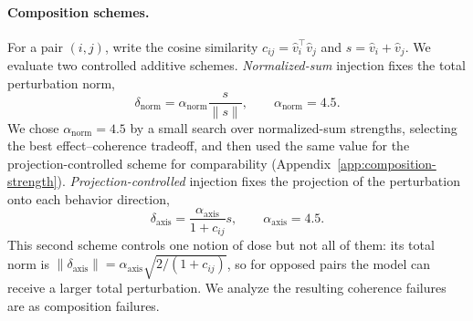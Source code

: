 \documentclass{article}
\begin{document}
\paragraph{Composition schemes.}
For a pair $(i,j)$, write the cosine similarity $c_{ij}=\hat v_i^\top \hat v_j$ and $s=\hat v_i+\hat v_j$. We evaluate two
controlled additive schemes. \emph{Normalized-sum} injection fixes the total perturbation norm,
\begin{equation}
  \delta_{\mathrm{norm}} = \alpha_{\mathrm{norm}}\frac{s}{\lVert s\rVert},
  \qquad \alpha_{\mathrm{norm}}=4.5.
  \label{eq:normsum}
\end{equation}
We chose $\alpha_{\mathrm{norm}}=4.5$ by a small search over normalized-sum strengths, selecting the
best effect--coherence tradeoff, and then used the same value for the projection-controlled scheme
for comparability (Appendix~\ref{app:composition-strength}). \emph{Projection-controlled} injection fixes
the projection of the perturbation onto each behavior direction,
\begin{equation}
  \delta_{\mathrm{axis}} = \frac{\alpha_{\mathrm{axis}}}{1+c_{ij}}s,
  \qquad \alpha_{\mathrm{axis}}=4.5.
  \label{eq:axis}
\end{equation}
This second scheme controls one notion of dose but not all of them: its total norm is
$\lVert\delta_{\mathrm{axis}}\rVert=\alpha_{\mathrm{axis}}\sqrt{2/(1+c_{ij})}$, so for opposed pairs the model can
receive a larger total perturbation. We analyze the
resulting coherence failures are as composition failures.
\end{document}
